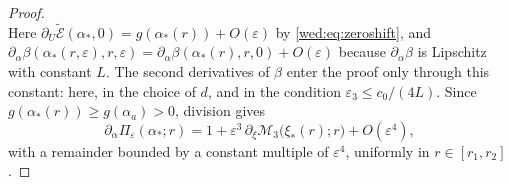 \begin{proof}
\[\]
Here $\partial_U\tilde{\mathcal E}(\alpha_*,0)=g(\alpha_*(r))+O(\varepsilon)$ by \eqref{wed:eq:zeroshift}, and $\partial_\alpha\beta(\alpha_*(r,\varepsilon),r,\varepsilon)=\partial_\alpha\beta(\alpha_*(r),r,0)+O(\varepsilon)$ because $\partial_\alpha\beta$ is Lipschitz with constant $L$. The second derivatives of $\beta$ enter the proof only through this constant: here, in the choice of $d$, and in the condition $\varepsilon_3\le c_0/(4L)$. Since $g(\alpha_*(r))\ge g(\alpha_a)>0$, division gives
\begin{equation}\label{wed:eq:returnslope}
\partial_\alpha\Pi_\varepsilon(\alpha_*;r)=1+\varepsilon^3\,\partial_\xi\mathcal M_3\bigl(\xi_*(r);r\bigr)+O(\varepsilon^4),
\end{equation}
with a remainder bounded by a constant multiple of $\varepsilon^4$, uniformly in $r\in[r_1,r_2]$.


\end{proof}
